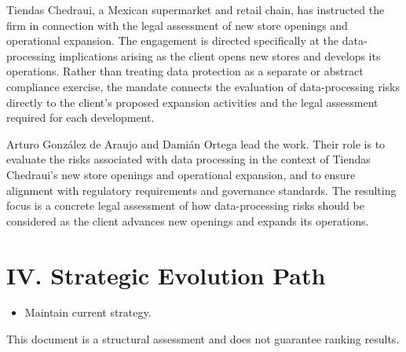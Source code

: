 \documentclass[11pt]{article}
\begin{document}
\begin{itemize}
Tiendas Chedraui, a Mexican supermarket and retail chain, has instructed the firm in connection with the legal assessment of new store openings and operational expansion. The engagement is directed specifically at the data-processing implications arising as the client opens new stores and develops its operations. Rather than treating data protection as a separate or abstract compliance exercise, the mandate connects the evaluation of data-processing risks directly to the client’s proposed expansion activities and the legal assessment required for each development.

Arturo González de Araujo and Damián Ortega lead the work. Their role is to evaluate the risks associated with data processing in the context of Tiendas Chedraui’s new store openings and operational expansion, and to ensure alignment with regulatory requirements and governance standards. The resulting focus is a concrete legal assessment of how data-processing risks should be considered as the client advances new openings and expands its operations.

\end{itemize}

\section*{IV. Strategic Evolution Path}
\begin{itemize}
\item Maintain current strategy.
\end{itemize}

\vfill
\centering
\small{This document is a structural assessment and does not guarantee ranking results.}
\end{document}
